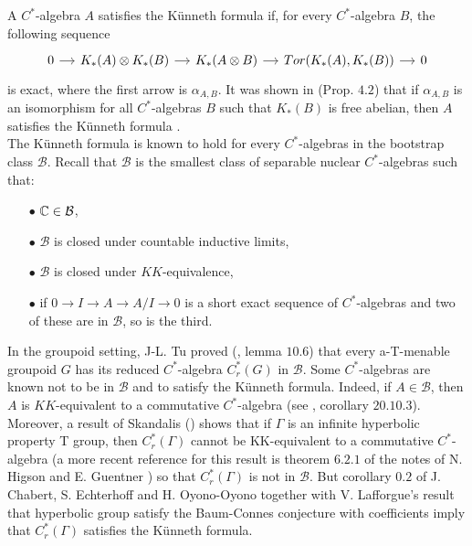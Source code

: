 A $C^*$-algebra $A$ satisfies the Künneth formula if, for every $C^*$-algebra $B$, the following sequence 
\[\begin{tikzcd}[column sep = small] 
0 \arrow{r} & K_*(A)\otimes K_*(B)\arrow{r} & K_*(A\otimes B) \arrow{r} & Tor(K_*(A),K_*(B))\arrow{r} & 0 
\end{tikzcd}\]
is exact, where the first arrow is $\alpha_{A,B}$. It was shown in \cite{ChabertEOY} (Prop. $4.2$) that if $\alpha_{A,B}$ is an isomorphism for all $C^*$-algebras $B$ such that $K_*(B)$ is free abelian, then $A$ satisfies the Künneth formula .\\ 

The Künneth formula is known to hold for every $C^*$-algebras in the bootstrap class $\mathcal B$. Recall that $\mathcal B$ is the smallest class of separable nuclear $C^*$-algebras such that:
\begin{itemize}
\item[$\bullet$] $\mathbb C \in \mathcal B$,
\item[$\bullet$] $\mathcal B$ is closed under countable inductive limits,  
\item[$\bullet$] $\mathcal B$ is closed under $KK$-equivalence,
\item[$\bullet$] if $0 \rightarrow I \rightarrow A \rightarrow A/I \rightarrow 0$ is a short exact sequence of $C^*$-algebras and two of these are in $\mathcal B$, so is the third. 
\end{itemize}
In the groupoid setting, J-L. Tu proved (\cite{TuThese}, lemma $10.6$) that every a-T-menable groupoid $G$ has its reduced $C^*$-algebra $C^*_r(G)$ in $\mathcal B$. Some $C^*$-algebras are known not to be in $\mathcal B$ and to satisfy the Künneth formula. Indeed, if $A\in \mathcal B$, then $A$ is $KK$-equivalent to a commutative $C^*$-algebra (see \cite{blackadar}, corollary $20.10.3$). Moreover, a result of Skandalis (\cite{SkandalisNotion}) shows that if $\Gamma$ is an infinite hyperbolic property T group, then $C^*_r(\Gamma)$ cannot be KK-equivalent to a commutative $C^*$-algebra (a more recent reference for this result is theorem $6.2.1$ of the notes of N. Higson and E. Guentner \cite{HigsonGuentnerNotes}) so that $C^*_r(\Gamma)$ is not in $\mathcal B$. But corollary $0.2$ of J. Chabert, S. Echterhoff and H. Oyono-Oyono \cite{ChabertEOY} together with V. Lafforgue's result \cite{lafforgue2012conjecture} that hyperbolic group satisfy the Baum-Connes conjecture with coefficients imply that $C^*_r(\Gamma)$ satisfies the Künneth formula.\\

